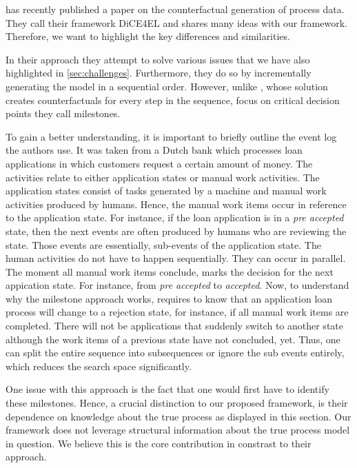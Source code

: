 \documentclass[./../../paper.tex]{subfiles}
\begin{document}
\citeauthor{hsieh_DiCE4ELInterpretingProcess_2021} has recently published a paper on the counterfactual generation of process data. They call their framework DiCE4EL and shares many ideas with our framework. Therefore, we want to highlight the key differences and similarities. 

In their approach they attempt to solve various issues that we have also highlighted in \autoref{sec:challenges}. Furthermore, they do so by incrementally generating the model in a sequential order. However, unlike \citeauthor{oberst_CounterfactualOffPolicyEvaluation_2019}, whose solution creates counterfactuals for every step in the sequence, \citeauthor{hsieh_DiCE4ELInterpretingProcess_2021} focus on critical decision points they call milestones. 

To gain a better understanding, it is important to briefly outline the event log the authors use. It was taken from a Dutch bank which processes loan applications in which customers request a certain amount of money. The activities relate to either application states or manual work activities. The application states consist of tasks generated by a machine and manual work activities produced by humans. Hence, the manual work items occur in reference to the application state. For instance, if the loan application is in a \emph{pre accepted} state, then the next events are often produced by humans who are reviewing the state. Those events are essentially, sub-events of the application state. The human activities do not have to happen sequentially. They can occur in parallel. The moment all manual work items conclude, marks the decision for the next appication state. For instance, from \emph{pre accepted} to \emph{accepted}. Now, to understand why the milestone approach works, requires to know that an application loan process will change to a rejection state, for instance, if all manual work items are completed. There will not be applications that suddenly switch to another state although the work items of a previous state have not concluded, yet. Thus, one can split the entire sequence into subsequences or ignore the sub events entirely, which reduces the search space significantly. 

One issue with this approach is the fact that one would first have to identify these milestones. Hence, a crucial distinction to our proposed framework, is their dependence on knowledge about the true process as displayed in this section. Our framework does not leverage structural information about the true process model in question. We believe this is the core contribution in constrast to their approach.
\end{document}
